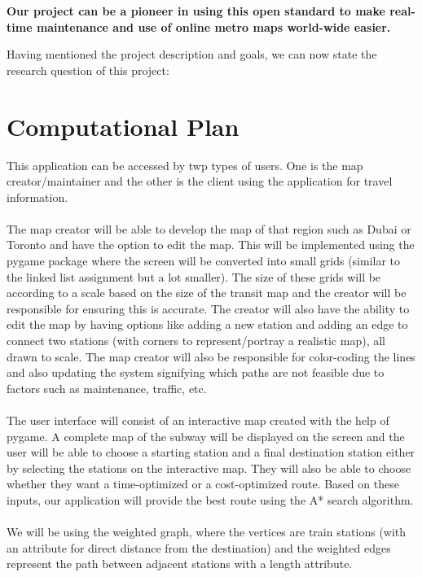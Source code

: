 \documentclass[fontsize=11pt]{article}
\begin{document}
\textbf{
Our project can be a pioneer in using this open standard to make real-time maintenance and use of online metro maps world-wide easier.
}\newline

Having mentioned the project description and goals, we can now state the research question of this project:

\textbf{
}

\section*{Computational Plan}
This application can be accessed by twp types of users. One is the map creator/maintainer and the other is the client using the application for travel information.\\
\\
The map creator will be able to develop the map of that region such as Dubai or Toronto and have the option to edit the map. This will be implemented using the pygame package where the screen will be converted into small grids (similar to the linked list assignment but a lot smaller). The size of these grids will be according to a scale based on the size of the transit map and the creator will be responsible for ensuring this is accurate. The creator will also have the ability to edit the map by having options like adding a new station and adding an edge to connect two stations (with corners to represent/portray a realistic map), all drawn to scale. The map creator will also be responsible for color-coding the lines and also updating the system signifying which paths are not feasible due to factors such as maintenance, traffic, etc. \\
\\
The user interface will consist of an interactive map created with the help of pygame. A complete map of the subway will be displayed on the screen and the user will be able to choose a starting station and a final destination station either by selecting the stations on the interactive map. They will also be able to choose whether they want a time-optimized or a cost-optimized route. Based on these inputs, our application will provide the best route using the A* search algorithm.\\
 \\
We will be using the weighted graph, where the vertices are train stations (with an attribute for direct distance from the destination) and the weighted edges represent the path between adjacent stations with a length attribute. \\
\end{document}
